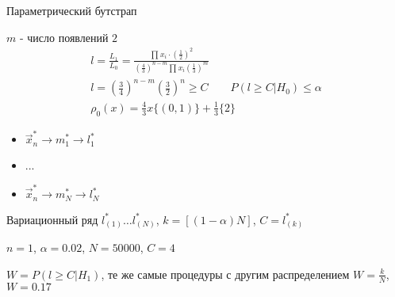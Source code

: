 \documentclass{article}
\begin{document}
\begin{eg}
  Параметрический бутстрап

  $m$ - число появлений $2$
  \begin{gather*}
    l=\frac{L_1}{L_0}=\frac{\prod_{}^{}x_i\cdot \left(\frac{1}{2}\right)^{2}}{\left(\frac{4}{3}\right)^{n-m}\prod_{}^{}x_i\left(\frac{1}{3}\right)^{m}} \\ 
    l=\left(\frac{3}{4}\right)^{n-m}\left(\frac{3}{2}\right)^{n} \ge C \qquad P(l\ge C | H_0) \le \alpha \\ 
    \rho_0(x)=\frac{4}{3}x\{(0,1)\}+\frac{1}{3}\{2\}
  \end{gather*}
  \begin{itemize}
    \item $\vec{x}_n^{*} \rightarrow m_{1}^{*} \rightarrow l_1^{*}$
    \item ...
    \item $\vec{x}_n^{*} \rightarrow m_{N}^{*} \rightarrow l_N^{*}$
  \end{itemize}
  Вариационный ряд $l_{(1)}^{*}\dots l_{(N)}^{*}$, $k=[(1-\alpha)N]$, $C=l_{(k)}^{*}$

  $n=1$, $\alpha=0.02$, $N=50 0 0 0$, $C=4$

  $W=P(l \ge C|H_1)$, те же самые процедуры с другим распределением $W=\frac{k}{N}$, $W=0.17$
\end{eg}
\end{document}
